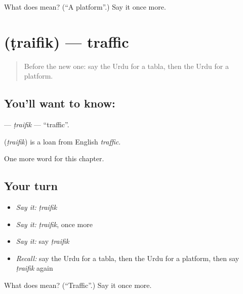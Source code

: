 \begin{tcolorbox}[breakable,colback=teal!4,colframe=teal!35!black,title={Before you move on}]
What does   mean? (\textquotedblleft{}A platform\textquotedblright{}.) Say it once more.
\end{tcolorbox}
\section[\texorpdfstring{\ur{ٹریفک} (ṭraifik)}{ٹریفک (ṭraifik)}]{ (ṭraifik) — traffic}

\label{lesson:UR-C255-traifik}



\begin{quote}
Before the new one: say the Urdu for a tabla, then the Urdu for a platform.
\end{quote}

\subsection*{You'll want to know: }
\textbf{} — \emph{ṭraifik} — \textquotedblleft{}traffic\textquotedblright{}.

\begin{cousinweb}
\textbf{} (\emph{ṭraifik}) is a loan from English \emph{traffic}.
\end{cousinweb}

\begin{grammarlens}[title={What you've built}]
One more word for this chapter.
\end{grammarlens}

\subsection*{Your turn}
\begin{itemize}
\raggedright
  \item \emph{Say it:} \emph{ṭraifik}
  \item \emph{Say it:} \emph{ṭraifik}, once more
  \item \emph{Say it:} say \emph{ṭraifik}
  \item \emph{Recall:} say the Urdu for a tabla, then the Urdu for a platform, then say \emph{ṭraifik} again
\end{itemize}

\begin{tcolorbox}[breakable,colback=teal!4,colframe=teal!35!black,title={Before you move on}]
What does  mean? (\textquotedblleft{}Traffic\textquotedblright{}.) Say it once more.
\end{tcolorbox}
